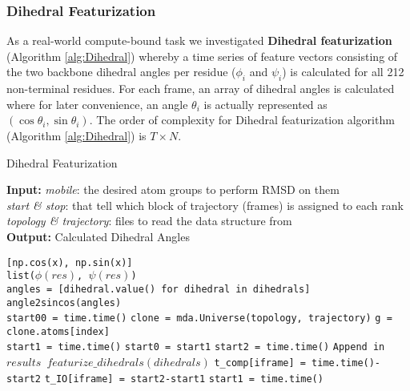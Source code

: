 \subsubsection{Dihedral Featurization}
As a real-world compute-bound task we investigated \textbf{Dihedral featurization} \cite{Sittel:2014aa} (Algorithm \ref{alg:Dihedral}) whereby a time series of
feature vectors consisting of the two backbone dihedral angles per residue ($\phi_{i}$ and $\psi_{i}$) is calculated for all 212
non-terminal residues. For each frame, an array of dihedral angles is calculated where for later convenience, an angle $\theta_{i}$ is
actually represented as $(\cos\theta_{i}, \sin\theta_{i})$. 
The order of complexity for Dihedral featurization algorithm (Algorithm \ref{alg:Dihedral}) is $T \times N$. 

\begin{algorithm}[t]
	\scriptsize
    \caption{Dihedral Featurization}
    \label{alg:Dihedral}
    \hspace*{\algorithmicindent} \textbf{Input:} \emph{mobile}: the desired atom groups to perform RMSD on them \\ 
    \hspace*{\algorithmicindent} \emph{start \& stop}: that tell which block of trajectory (frames) is assigned to each rank \\
    \hspace*{\algorithmicindent} \emph{topology \& trajectory}: files to read the data structure from \\
    \hspace*{\algorithmicindent} \textbf{Output:} Calculated Dihedral Angles
    \begin{algorithmic}[1]
        \State \Return \texttt{[np.cos(x), np.sin(x)]}
        \EndProcedure
        \\
        \State \texttt{list($\phi (res)$, $\psi (res)$)}
        \EndFor
        \EndProcedure
        \\
        \State \texttt{angles = [dihedral.value() for dihedral in dihedrals]}
        \State \Return \texttt{angle2sincos(angles)}
        \EndProcedure
        \\
        \State \texttt{start00 = time.time()}
        \State \texttt{clone = mda.Universe(topology, trajectory)}
        \State \texttt{g = clone.atoms[index]}
        \\
        \State \texttt{start1 = time.time()}
        \State \texttt{start0 = start1}
        \State \texttt{start2 = time.time()}
        \State \texttt{Append in $results$ $featurize\_dihedrals(dihedrals)$}
        \State \texttt{t\_comp[iframe] = time.time()-start2}
        \State \texttt{t\_IO[iframe] = start2-start1}
        \State \texttt{start1 = time.time()}
        \EndFor
        

\end{algorithmic}
\end{algorithm}
